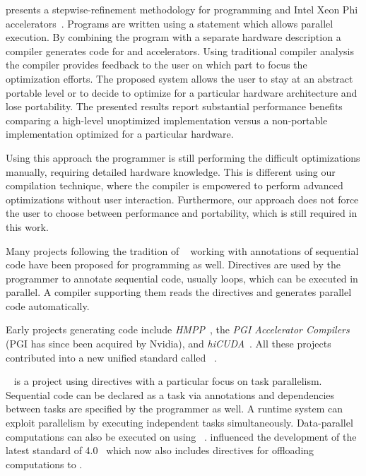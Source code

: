 \bigskip

\citeauthor{HijmaNiJaBa2015} presents a stepwise-refinement methodology for programming \GPUs and Intel Xeon Phi accelerators~\cite{HijmaNiJaBa2015}.
Programs are written using a  statement which allows parallel execution.
By combining the program with a separate hardware description a compiler generates code for \GPUs and accelerators.
Using traditional compiler analysis the compiler provides feedback to the user on which part to focus the optimization efforts.
The proposed system allows the user to stay at an abstract portable level or to decide to optimize for a particular hardware architecture and lose portability.
The presented results report substantial performance benefits comparing a high-level unoptimized implementation versus a non-portable implementation optimized for a particular hardware.

Using this approach the programmer is still performing the difficult optimizations manually, requiring detailed hardware knowledge.
This is different using our compilation technique, where the compiler is empowered to perform advanced optimizations without user interaction.
Furthermore, our approach does not force the user to choose between performance and portability, which is still required in this work.

\bigskip

Many projects following the tradition of \emph{\OpenMP}~\cite{OpenMP} working with annotations of sequential code have been proposed for \GPU programming as well.
Directives are used by the programmer to annotate sequential code, usually loops, which can be executed in parallel.
A compiler supporting them reads the directives and generates parallel code automatically.

Early projects generating \GPU code include \emph{HMPP}~\cite{DolbeauBiBo2007}, the \emph{PGI Accelerator Compilers} (PGI has since been acquired by Nvidia), and \emph{hiCUDA}~\cite{HanA11}.
All these projects contributed into a new unified standard called \emph{\OpenACC}~\cite{OpenACC}.

\emph{\OmpSs}~\cite{ElangovanBP12,DuranABLMMP11} is a project using directives with a particular focus on task parallelism.
Sequential code can be declared as a task via annotations and dependencies between tasks are specified by the programmer as well.
A runtime system can exploit parallelism by executing independent tasks simultaneously.
Data-parallel computations can also be executed on \GPUs using \OpenCL~\cite{ElangovanBP12}.
\OmpSs influenced the development of the latest standard of \emph{\OpenMP} 4.0~\cite{OpenMP} which now also includes directives for offloading computations to \GPUs.

